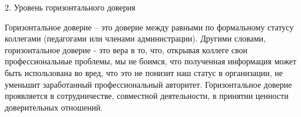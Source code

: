 \begin{frame}{2. Уровень горизонтального доверия}

\tiny
Горизонтальное доверие – это доверие между равными по формальному статусу коллегами (педагогами или членами администрации). Другими словами, горизонтальное доверие - это вера в то, что, открывая коллеге свои профессиональные проблемы, мы не боимся, что полученная информация может быть использована во вред, что это не понизит наш статус в организации, не уменьшит заработанный профессиональный авторитет. Горизонтальное доверие проявляется в сотрудничестве, совместной деятельности, в принятии ценности доверительных отношений.

\end{frame}


